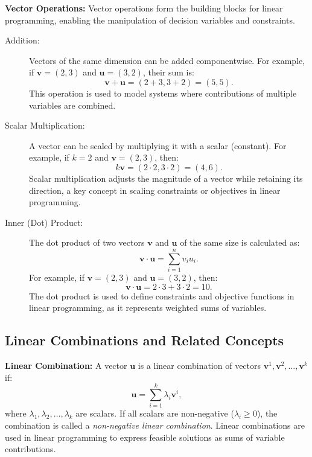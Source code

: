 \medskip  
\textbf{Vector Operations:}  
Vector operations form the building blocks for linear programming, enabling the manipulation of decision variables and constraints.

\begin{description}
    \item[Addition:]  
    Vectors of the same dimension can be added componentwise. For example, if \(\mathbf{v} = (2, 3)\) and \(\mathbf{u} = (3, 2)\), their sum is:  
    \[
    \mathbf{v} + \mathbf{u} = (2+3, 3+2) = (5, 5).
    \]  
    This operation is used to model systems where contributions of multiple variables are combined.

    \item[Scalar Multiplication:]  
    A vector can be scaled by multiplying it with a scalar (constant). For example, if \(k = 2\) and \(\mathbf{v} = (2, 3)\), then:
    \[
    k\mathbf{v} = (2 \cdot 2, 3 \cdot 2) = (4, 6).
    \]  
    Scalar multiplication adjusts the magnitude of a vector while retaining its direction, a key concept in scaling constraints or objectives in linear programming.

    \item[Inner (Dot) Product:]  
    The dot product of two vectors \(\mathbf{v}\) and \(\mathbf{u}\) of the same size is calculated as:
    \[
    \mathbf{v} \cdot \mathbf{u} = \sum_{i=1}^n v_i u_i.
    \]  
    For example, if \(\mathbf{v} = (2, 3)\) and \(\mathbf{u} = (3, 2)\), then:
    \[
    \mathbf{v} \cdot \mathbf{u} = 2 \cdot 3 + 3 \cdot 2 = 10.
    \]  
    The dot product is used to define constraints and objective functions in linear programming, as it represents weighted sums of variables.
\end{description}

\subsection{Linear Combinations and Related Concepts}

\textbf{Linear Combination:}  
A vector \(\mathbf{u}\) is a linear combination of vectors \(\mathbf{v}^1, \mathbf{v}^2, \dots, \mathbf{v}^k\) if:
\[
\mathbf{u} = \sum_{i=1}^k \lambda_i \mathbf{v}^i,
\]
where \(\lambda_1, \lambda_2, \dots, \lambda_k\) are scalars. If all scalars are non-negative (\(\lambda_i \geq 0\)), the combination is called a \emph{non-negative linear combination}. Linear combinations are used in linear programming to express feasible solutions as sums of variable contributions.

